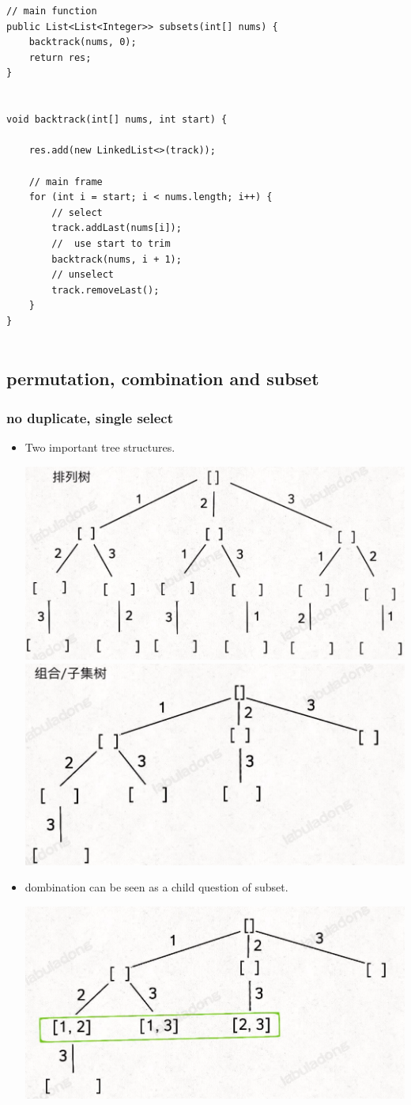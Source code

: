 \documentclass[a4paper,11pt,twoside]{book}
\begin{document}
\begin{itemize}
\begin{lstlisting}
// main function
public List<List<Integer>> subsets(int[] nums) {
	backtrack(nums, 0);
	return res;
}


void backtrack(int[] nums, int start) {
	
	res.add(new LinkedList<>(track));
	
	// main frame
	for (int i = start; i < nums.length; i++) {
		// select
		track.addLast(nums[i]);
		//  use start to trim
		backtrack(nums, i + 1);
		// unselect
		track.removeLast();
	}
}


\end{lstlisting}


\subsection{permutation, combination and subset}
\subsubsection{no duplicate, single select}
\begin{itemize}
	\item Two important tree structures.
\begin{center}
	\includegraphics[width=0.7\linewidth]{pics/per}
	\includegraphics[width=0.7\linewidth]{pics/com}
\end{center}
		
	\item dombination can be seen as a child question of subset. 
	\begin{center}
		\includegraphics[width=0.7\linewidth]{pics/subset}
	\end{center}
	

\end{itemize}
\end{itemize}
\end{document}
